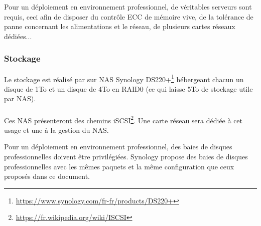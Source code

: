 \begin{tip}
Pour un déploiement en environnement professionnel, de véritables serveurs sont requis, ceci afin de disposer du contrôle ECC de mémoire vive, de la tolérance de panne concernant les alimentations et le réseau, de plusieurs cartes réseaux dédiées...
\end{tip}

\subsubsection{Stockage}
Le stockage est réalisé par sur NAS Synology DS220+\footnote{\url{https://www.synology.com/fr-fr/products/DS220+}} hébergeant chacun un disque de 1To et un disque de 4To en RAID0 (ce qui laisse 5To de stockage utile par NAS).\\
~\\
Ces NAS présenteront des chemins iSCSI\footnote{\url{https://fr.wikipedia.org/wiki/ISCSI}}. Une carte réseau sera dédiée à cet usage et une à la gestion du NAS.\\

\begin{tip}
Pour un déploiement en environnement professionnel, des baies de disques professionnelles doivent être privilégiées. Synology propose des baies de disques professionnelles avec les mêmes paquets et la même configuration que ceux proposés dans ce document.
\end{tip}
